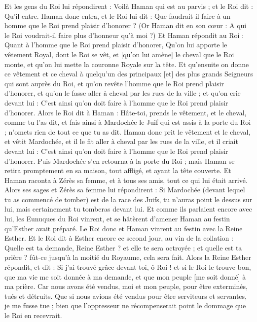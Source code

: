 \begin{multicols}{2}
Et les gens du Roi lui répondirent : Voilà Haman qui est au parvis ; et le Roi dit : Qu'il entre.
Haman donc entra, et le Roi lui dit : Que faudrait-il faire à un homme que le Roi prend plaisir d'honorer ? (Or Haman dit en son cœur : A qui le Roi voudrait-il faire plus d'honneur qu'à moi ?)
Et Haman répondit au Roi : Quant à l'homme que le Roi prend plaisir d'honorer,
Qu'on lui apporte le vêtement Royal, dont le Roi se vêt, et [qu'on lui amène] le cheval que le Roi monte, et qu'on lui mette la couronne Royale sur la tête.
Et qu'ensuite on donne ce vêtement et ce cheval à quelqu'un des principaux [et] des plus grands Seigneurs qui sont auprès du Roi, et qu'on revête l'homme que le Roi prend plaisir d'honorer, et qu'on le fasse aller à cheval par les rues de la ville ; et qu'on crie devant lui : C'est ainsi qu'on doit faire à l'homme que le Roi prend plaisir d'honorer.
Alors le Roi dit à Haman : Hâte-toi, prends le vêtement, et le cheval, comme tu l'as dit, et fais ainsi à Mardochée le Juif qui est assis à la porte du Roi ; n'omets rien de tout ce que tu as dit.
Haman donc prit le vêtement et le cheval, et vêtit Mardochée, et il le fit aller à cheval par les rues de la ville, et il criait devant lui : C'est ainsi qu'on doit faire à l'homme que le Roi prend plaisir d'honorer.
Puis Mardochée s'en retourna à la porte du Roi ; mais Haman se retira promptement en sa maison, tout affligé, et ayant la tête couverte.
Et Haman raconta à Zérès sa femme, et à tous ses amis, tout ce qui lui était arrivé. Alors ses sages et Zérès sa femme lui répondirent : Si Mardochée (devant lequel tu as commencé de tomber) est de la race des Juifs, tu n'auras point le dessus sur lui, mais certainement tu tomberas devant lui.
Et comme ils parlaient encore avec lui, les Eunuques du Roi vinrent, et se hâtèrent d'amener Haman au festin qu'Esther avait préparé.
\VerseOne{}Le Roi donc et Haman vinrent au festin avec la Reine Esther.
Et le Roi dit à Esther encore ce second jour, au vin de la collation : Quelle est ta demande, Reine Esther ? et elle te sera octroyée ; et quelle est ta prière ? fût-ce jusqu'à la moitié du Royaume, cela sera fait.
Alors la Reine Esther répondit, et dit : Si j'ai trouvé grâce devant toi, ô Roi ! et si le Roi le trouve bon, que ma vie me soit donnée à ma demande, et que mon peuple [me soit donné] à ma prière.
Car nous avons été vendus, moi et mon peuple, pour être exterminés, tués et détruits. Que si nous avions été vendus pour être serviteurs et servantes, je me fusse tue ; bien que l'oppresseur ne récompenserait point le dommage que le Roi en recevrait.

\end{multicols}
